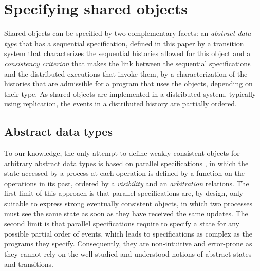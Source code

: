 \documentclass[9pt,numbers]{sigplanconf}
\begin{document}
\section{Specifying shared objects}\label{section:formalization}
\vspace{2mm}


Shared objects can be specified by two complementary facets:
an \emph{abstract data type} that has a sequential specification, defined in this 
paper by a transition system that characterizes the sequential histories allowed 
for this object and a \emph{consistency criterion}
that makes the link between the sequential specifications and the
distributed executions that invoke them, by a characterization of the histories that
are admissible for a program that uses the objects, depending on their type.
As shared objects are implemented in a distributed system, typically using replication, 
the events in a distributed history are partially ordered. 

\vspace{1mm}
\subsection{Abstract data types}
\vspace{1mm}

To our knowledge, the only attempt to define weakly consistent objects for arbitrary abstract data types is based on 
parallel specifications \cite{BGYZ14}, in which the state accessed by a process at each operation is defined by a 
function on the operations in its past, ordered by a \emph{visibility} and an \emph{arbitration} relations.
The first limit of this approach is that parallel specifications are, by design, only suitable to express 
strong eventually consistent objects, in which two processes must see the same state as soon as they have received 
the same updates. The second limit is that parallel specifications require to specify a state for any possible 
partial order of events, which leads to specifications as complex as the programs they specify.
Consequently, they are non-intuitive and error-prone
as they cannot rely on the well-studied and understood notions of abstract states and transitions.
\end{document}
